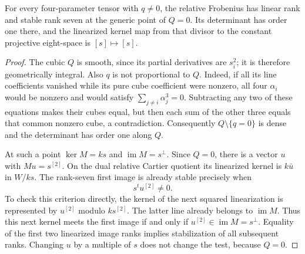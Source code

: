 \begin{lemma}
\label{lem:nonordinary-uniform-Q-stable-loss-candidate}
For every four-parameter tensor with $q\ne0$, the relative Frobenius
has linear rank and stable rank seven at the generic point of $Q=0$.
Its determinant has order one there, and the linearized kernel map
from that divisor to the constant projective eight-space is $[s]\mapsto[s]$.
\end{lemma}
\begin{proof}
The cubic $Q$ is smooth, since its partial derivatives are $s_i^2$;
it is therefore geometrically integral. Also $q$ is not proportional
to $Q$. Indeed, if all its line coefficients vanished while its pure
cube coefficient were nonzero, all four $\alpha_i$ would be nonzero
and would satisfy $\sum_{j\ne i}\alpha_j^3=0$. Subtracting any two
of these equations makes their cubes equal, but then each sum of the
other three equals that common nonzero cube, a contradiction.
Consequently $Q\setminus\{q=0\}$ is dense and the determinant has
order one along $Q$.

At such a point $\ker M=ks$ and $\operatorname{im}M=s^\perp$.
Since $Q=0$, there is a vector $u$ with $Mu=s^{[2]}$. On the dual
relative Cartier quotient its linearized kernel is $k\bar u$ in
$W/ks$. The rank-seven first image is already stable precisely when
\begin{equation}\label{eq:nonordinary-Q-stable-test-candidate}
                          s^t u^{[2]}\ne0.
\end{equation}
To check this criterion directly, the kernel of the next squared
linearization is represented by $u^{[2]}$ modulo $ks^{[2]}$.
The latter line already belongs to $\operatorname{im}M$.
Thus this next kernel meets the first image if and only if
$u^{[2]}\in\operatorname{im}M=s^\perp$. Equality of the first two
linearized image ranks implies stabilization of all subsequent ranks.
Changing $u$ by a multiple of $s$ does not change the test, because
$Q=0$.


\end{proof}

